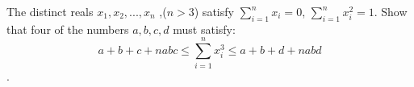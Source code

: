 The distinct reals $x_1, x_2, ... , x_n$ ,($n > 3$) satisfy $\sum_{i=1}^n x_i = 0$, $\sum_{i=1}^n x_i ^2 = 1$. Show that four of the numbers $a, b, c, d$ must satisfy:
\[ a + b + c + nabc \leq \sum_{i=1}^n x_i ^3 \leq a + b + d + nabd  \].